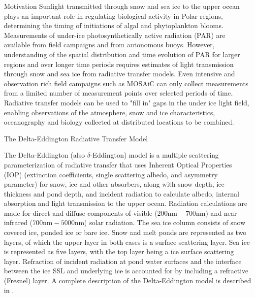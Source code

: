 \documentclass[final]{beamer}
\newlength{\colwidth}
\begin{document}
\begin{frame}[t,fragile]
\begin{columns}[t]
\begin{column}{\colwidth}
\begin{block}{Motivation}
    Sunlight transmitted through snow and sea ice to the upper ocean plays an
    important role in regulating biological activity in Polar regions,
    determining the timing of initiations of algal and phytoplankton blooms.
    Measurements of under-ice photosynthetically active radiation (PAR) are
    available from field campaigns and from autonomous buoys. However,
    understanding of the spatial distribution and time evolution of PAR for
    larger regions and over longer time periods requires estimates of light
    transmission through snow and sea ice from radiative transfer models. Even
    intensive and observation rich field campaigns such as MOSAiC can only
    collect measurements from a limited number of measurement points over
    selected periods of time. Radiative transfer models can be used to "fill
    in" gaps in the under ice light field, enabling observations of the
    atmosphere, snow and ice characteristics, oceanography and biology
    collected at distributed locations to be combined.

  \end{block}

  \begin{block}{The Delta-Eddington Radiative Transfer Model}

    The Delta-Eddington (also $\delta$-Eddington) model is a multiple
    scattering parameterization of radiative transfer that uses
    Inherent Optical Properties (IOP) (extinction coefficients, single
    scattering albedo, and asymmetry parameter) for snow, ice and
    other absorbers, along with snow depth, ice thickness and pond
    depth, and incident radiation to calculate albedo, internal
    absorption and light transmission to the upper ocean.  Radiation
    calculations are made for direct and diffuse components of visible
    ($200 \mathrm{nm} - 700 \mathrm{nm}$) and near-infrared ($700
    \mathrm{nm} - 5000 \mathrm{nm}$) solar radiation.  The sea ice
    column consists of snow covered ice, ponded ice or bare ice.  Snow
    and melt ponds are represented as two layers, of which the upper
    layer in both cases is a surface scattering layer.  Sea ice is
    represented as five layers, with the top layer being a ice surface
    scattering layer.  Refraction of incident radiation at pond water
    surfaces and the interface between the ice SSL and underlying ice
    is accounted for by including a refractive (Fresnel) layer.  A
    complete description of the Delta-Eddington model is described in
    \cite{briegleb_delta-eddington_2007}.
    

\end{block}
\end{column}
\end{columns}
\end{frame}
\end{document}
